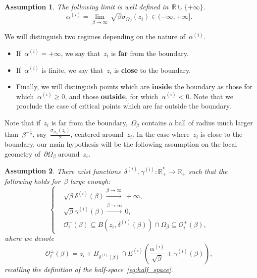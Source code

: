 \documentclass[10pt]{article}
\newcommand{\R}{\mathbb{R}}
\newcommand{\1}{\mathbbm 1}
\newcommand{\deltaRadius}[1]{\delta^{(#1)}} %
\newcommand{\epsLimit}[1]{\alpha^{(#1)}} %
\newcommand{\localNeighborhood}[2][]{\mathcal{O}_{#2}^{#1}} %
\newcommand{\gammaPerturbation}[1]{\gamma^{(#1)}}
\newcommand{\halfSpace}[1]{E^{(#1)}}
\newtheorem{hypothesis}{Assumption}
\begin{document}
    \begin{hypothesis}
    The following limit is well defined in~$\R\cup\{+\infty\}$.
    \begin{equation}
        \label{eq:epsLimit_definition}
        \tag{\bf H0}
        \epsLimit{i} =\underset{\beta\to\infty}{\lim}\, \sqrt\beta\sigma_{\Omega_\beta}(z_i) \in (-\infty,+\infty].
    \end{equation}
    \end{hypothesis}

    We will distinguish two regimes depending on the nature of~$\epsLimit{i}$.
    \begin{itemize}
        \item If~$\epsLimit{i}= +\infty$, we say that~$z_i$ is {\bf far} from the boundary.
        \item If~$\epsLimit{i}$ is finite, we say that~$z_i$ is {\bf close} to the boundary.
        \item Finally, we will distinguish points which are {\bf inside} the boundary as those for which~$\epsLimit{i}\geq0$, and those {\bf outside}, for which~$\epsLimit{i}<0$. Note that we proclude the case of critical points which are far outside the boundary.
    \end{itemize}
    Note that if~$z_i$ is far from the boundary,~$\Omega_\beta$ contains a ball of radius much larger than~$\beta^{-\frac12}$, say~$\frac{\sigma_{\Omega_\beta}(z_i)}2$, centered around~$z_i$.
    In the case where~$z_i$ is close to the boundary, our main hypothesis will be the following assumption on the local geometry of~$\partial\Omega_\beta$ around~$z_i$.

    \begin{hypothesis}     
        There exist functions~$\deltaRadius{i},\gammaPerturbation{i}:\R_+^*\to\R_+$ such that the following holds for~$\beta$ large enough:
        \begin{equation}
            \label{eq:domain_sandwich_inclusion}
            \tag{\bf H1}
            \left\{\begin{aligned}
                &\sqrt\beta\deltaRadius{i}(\beta)\xrightarrow{\beta\to\infty}\,+\infty,\\
                &\sqrt\beta\gammaPerturbation{i}(\beta)\xrightarrow{\beta\to\infty}\,0,\\
                &\localNeighborhood[-]{i}(\beta) \subseteq B(z_i,\deltaRadius{i}(\beta))\cap\Omega_\beta \subseteq \localNeighborhood[+]{i}(\beta),
            \end{aligned}\right.
        \end{equation}
        where we denote
        \begin{equation}
            \label{eq:capped_balls}
            \localNeighborhood[\pm]{i}(\beta) = z_i + B_{\deltaRadius{i}(\beta)} \cap \halfSpace{i}\left(\frac{\epsLimit{i}}{\sqrt\beta}\pm\gammaPerturbation{i}(\beta)\right),
        \end{equation}
        recalling the definition of the half-space~\eqref{eq:half_space}.
    \end{hypothesis}
\end{document}
